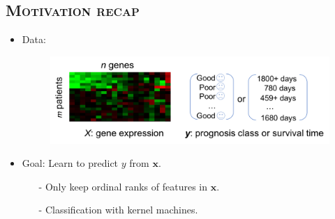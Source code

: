 \documentclass[xcolor=x11names,compress]{beamer}
\theoremstyle{plain}
\renewcommand{\(}{\begin{columns}}
\renewcommand{\)}{\end{columns}}
\newcommand{\<}[1]{\begin{column}{#1}}
\renewcommand{\>}{\end{column}}
\begin{document}
\subsection{\scshape Motivation recap}
\begin{frame}{\insertsubsection}
	
	\begin{itemize}
		\item Data: 
		\begin{figure}
			\centering
			\includegraphics[width=\linewidth]{slides/prognosis}
		\end{figure}
		
		\item Goal: Learn to predict $y$ from $\mathbf{x}$.
		\begin{itemize}
			\item[-] Only keep ordinal ranks of features in $\mathbf{x}$.
			\item[-] Classification with kernel machines.
		\end{itemize}
	\end{itemize}
	
\end{frame}
\end{document}
